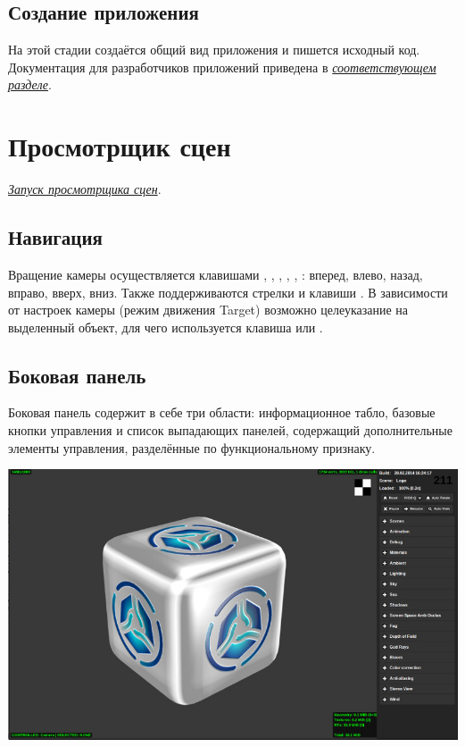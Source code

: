 \documentclass[a4paper,12pt,oneside]{sphinxmanual}
\begin{document}
\section{Создание приложения}
\label{working_process_stages:id7}
На этой стадии создаётся общий вид приложения и пишется исходный код. Документация для разработчиков приложений приведена в {\hyperref[developers:developers]{\emph{соответствующем разделе}}}.


\chapter{Просмотрщик сцен}
\label{viewer:viewer}\label{viewer:index-0}\label{viewer::doc}\label{viewer:id1}
{\hyperref[setup:getting-started-launching-viewer]{\emph{Запуск просмотрщика сцен}}}.


\section{Навигация}
\label{viewer:id2}
Вращение камеры осуществляется клавишами , , , , , : вперед, влево, назад, вправо, вверх, вниз. Также поддерживаются стрелки и клавиши . В зависимости от настроек камеры (режим движения Target) возможно целеуказание на выделенный объект, для чего используется клавиша  или .


\section{Боковая панель}
\label{viewer:id3}
Боковая панель содержит в себе три области: информационное табло, базовые кнопки
управления и список выпадающих панелей, содержащий дополнительные элементы управления, разделённые по функциональному признаку.

{\hfill\includegraphics[width=1.000\linewidth]{default_page.jpg}\hfill}
\end{document}
